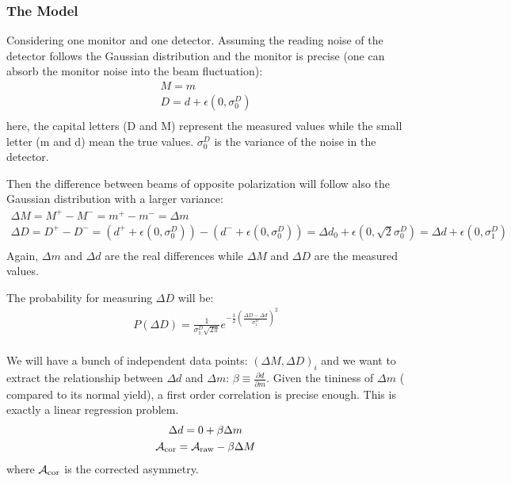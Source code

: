 \subsubsection{The Model}
Considering one monitor and one detector. Assuming the reading noise of the detector
follows the Gaussian distribution and the monitor is precise (one can absorb the monitor
noise into the beam fluctuation):
\begin{equation}
    \begin{gathered}
	M = m	\\
	D = d + \epsilon(0, \sigma_0^D)    \\
    \end{gathered}
\end{equation}
here, the capital letters (D and M) represent the measured values while the 
small letter (m and d) mean the true values. $\sigma_0^D$ 
is the variance of the noise in the detector.

Then the difference between beams of opposite polarization will follow also
the Gaussian distribution with a larger variance:
\begin{equation}
    \begin{gathered}
	\Delta M = M^+ - M^- = m^+ - m^- = \Delta m   \\
	\Delta D = D^+ - D^- = (d^+ + \epsilon(0, \sigma_0^D)) - (d^- + \epsilon(0, \sigma_0^D))
	    = \Delta d_0 + \epsilon(0, \sqrt{2}\sigma_0^D)
	    = \Delta d + \epsilon(0, \sigma_1^D) \\
    \end{gathered}
\end{equation}
Again, $\Delta m$ and $\Delta d$ are the real differences
while $\Delta M$ and $\Delta D$ are the measured values.

The probability for measuring $\Delta D$ will be:
\begin{equation}
    \begin{gathered}
	P(\Delta D) = \frac{1}{\sigma_1^D\sqrt{2\pi}} e^{-\frac{1}{2}\left( \frac{\Delta D - \Delta d}{\sigma_1^D}\right)^2}    \\
    \end{gathered}
\end{equation}

We will have a bunch of independent data points: $(\Delta M, \Delta D)_i$ and 
we want to extract the relationship between $\Delta d$ and $\Delta m$: 
$\beta \equiv \frac{\partial d}{\partial m}$. Given the tininess of $\Delta m$ (
compared to its normal yield), a first order correlation is precise enough. 
This is exactly a linear regression problem.
\begin{equation}
    \begin{gathered}
	\Delta d = 0 + \beta \Delta m	\\
	\mathcal{A}_{\text{cor}} = \mathcal{A}_{\text{raw}} - \beta\Delta M	\\
    \end{gathered}
\end{equation}
where $\mathcal{A}_{\text{cor}}$ is the corrected asymmetry.


